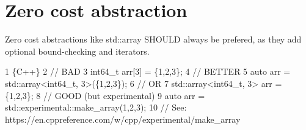 \section*{Zero cost abstraction}

Zero cost abstractions like {\ttfamily std\+::array} S\+H\+O\+U\+LD always be prefered, as they add optional bound-\/checking and iterators. 
\begin{DoxyCode}
1 \{C++\}
2 // BAD
3 int64\_t arr[3] = \{1,2,3\};
4 // BETTER
5 auto arr = std::array<int64\_t, 3>(\{1,2,3\});
6 // OR
7 std::array<int64\_t, 3> arr = \{1,2,3\};
8 // GOOD (but experimental)
9 auto arr = std::experimental::make\_array(1,2,3);
10 // See: https://en.cppreference.com/w/cpp/experimental/make\_array
\end{DoxyCode}
 